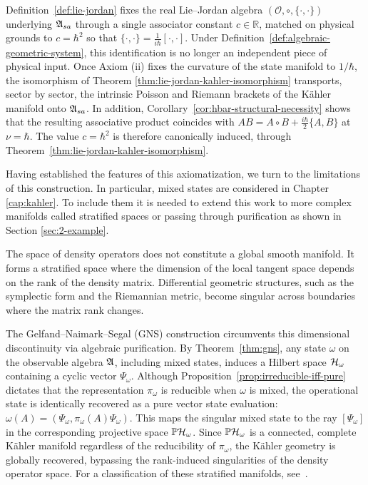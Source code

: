 \begin{remark}[The inherited constant $c = \hbar^2$ of the Lie--Jordan algebra]
	Definition~\ref{def:lie-jordan} fixes the real Lie--Jordan algebra
	$(\mathcal{O}, \circ, \{\cdot,\cdot\})$ underlying $\mathfrak{A}_{sa}$ through a single
	associator constant $c \in \mathbb{R}$, matched on physical grounds to $c = \hbar^2$ so that $\{\cdot,\cdot\} = \frac{1}{i\hbar}[\cdot,\cdot]$. Under
	Definition~\ref{def:algebraic-geometric-system}, this identification is no longer an
	independent piece of physical input. Once Axiom (ii) fixes the curvature of the state
	manifold to $1/\hbar$, the isomorphism of Theorem \ref{thm:lie-jordan-kahler-isomorphism} transports, sector by sector, the intrinsic
	Poisson and Riemann brackets of the Kähler manifold onto $\mathfrak{A}_{sa}$. In addition, Corollary~\ref{cor:hbar-structural-necessity} shows that the resulting associative product
	coincides with $AB = A \circ B + \frac{i\hbar}{2}\{A,B\}$ at $\nu = \hbar$. The value
	$c = \hbar^2$ is therefore canonically induced, through
	Theorem~\ref{thm:lie-jordan-kahler-isomorphism}.
\end{remark}

Having established the features of this axiomatization, we turn to the limitations of this construction. In particular, mixed states are considered in Chapter \ref{cap:kahler}. To include them it is needed to extend this work to more complex manifolds called stratified spaces or passing through purification as shown in Section \ref{sec:2-example}.

\begin{remark}
	\label{rem:purification-stratified-spaces}
	The space of density operators does not constitute a global smooth manifold. It forms a stratified space where the dimension of the local tangent space depends on the rank of the density matrix. Differential geometric structures, such as the symplectic form and the Riemannian metric, become singular across boundaries where the matrix rank changes.
	
	The Gelfand--Naimark--Segal (GNS) construction circumvents this dimensional discontinuity via algebraic purification. By Theorem~\ref{thm:gns}, any state $\omega$ on the observable algebra $\mathfrak{A}$, including mixed states, induces a Hilbert space $\H_\omega$ containing a cyclic vector $\Psi_\omega$. Although Proposition~\ref{prop:irreducible-iff-pure} dictates that the representation $\pi_\omega$ is reducible when $\omega$ is mixed, the operational state is identically recovered as a pure vector state evaluation: $\omega(A) = (\Psi_\omega, \pi_\omega(A) \Psi_\omega)$. This maps the singular mixed state  to the ray $[\Psi_\omega]$ in the corresponding projective space $\PH_\omega$. Since $\PH_\omega$ is a connected, complete Kähler manifold regardless of the reducibility of $\pi_\omega$, the Kähler geometry is globally recovered, bypassing the rank-induced singularities of the density operator space. For a  classification of these stratified manifolds, see~\cite{bengtssonGeometryQuantumStates2017}.
\end{remark}


